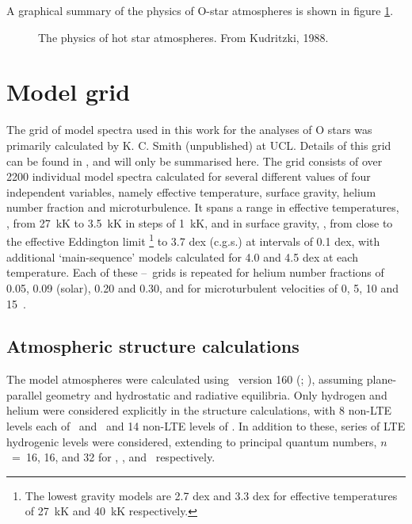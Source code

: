 A graphical summary of the physics of O-star atmospheres is shown in
figure \ref{fig:atmophys}.

\begin{figure} %
\epsfxsize=11cm
\setlength{\cen}{(\textwidth / 2) - (\epsfxsize / 2)}
\hspace{\cen}
\caption[Physics of O-stars atmospheres]
{\fcfont The physics of hot star atmospheres. From
Kudritzki, 1988.
}
\label{fig:atmophys}
\end{figure}   %


\section{Model grid}

The grid of model spectra used in this work for the analyses of O
stars was primarily calculated by K. C. Smith (unpublished) at
UCL. Details of this grid can be found in , and will
only be summarised here. The grid consists of over 2200 individual
model spectra calculated for several different values of four
independent variables, namely effective temperature, surface gravity,
helium number fraction and microturbulence. It spans a range in
effective temperatures, \teff, from 27~kK to 3.5~kK in steps of 1~kK,
and in surface gravity, \logg, from close to the effective Eddington
limit%
\footnote{The lowest gravity models are 2.7 dex and 3.3 dex for
effective temperatures of 27~kK and 40~kK respectively.}
%
to 3.7 dex (c.g.s.) at intervals of 0.1 dex, with additional
`main-sequence' models calculated for 4.0 and 4.5 dex at each
temperature. Each of these \teff--\logg\ grids is repeated for
helium number fractions of 0.05, 0.09 (solar), 0.20 and 0.30, and
for microturbulent velocities of 0, 5, 10 and 15~\kms.

\subsection{Atmospheric structure calculations}

The model atmospheres were calculated using \tlusty\ version 160
(\cite{tlusty1}; \cite{tlusty2}), assuming plane-parallel geometry and
hydrostatic and radiative equilibria. Only hydrogen and helium were
considered explicitly in the structure calculations, with 8 non-LTE
levels each of \hi\ and \heii\, and 14 non-LTE levels of \hei. In
addition to these, series of LTE hydrogenic levels were considered,
extending to principal quantum numbers, $n$~=~16, 16, and 32 for \hi,
\hei, and
\heii\ respectively.

